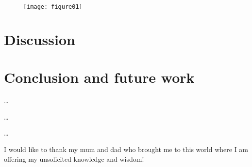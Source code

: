 \documentclass{COMPXXXX}
\begin{document}
\lipsum[8]

\begin{figure}
\centering
\texttt{[image: figure01]}
\caption{}
\label{fig:figure01}
\end{figure}


\section{Discussion}
\lipsum[9-11]

\section{Conclusion and future work}
\lipsum[12-13]



\dots

\dots

\dots 


\ack
I would like to thank my mum and dad who brought me to this world where I am offering my unsolicited knowledge and wisdom!


\end{document}
